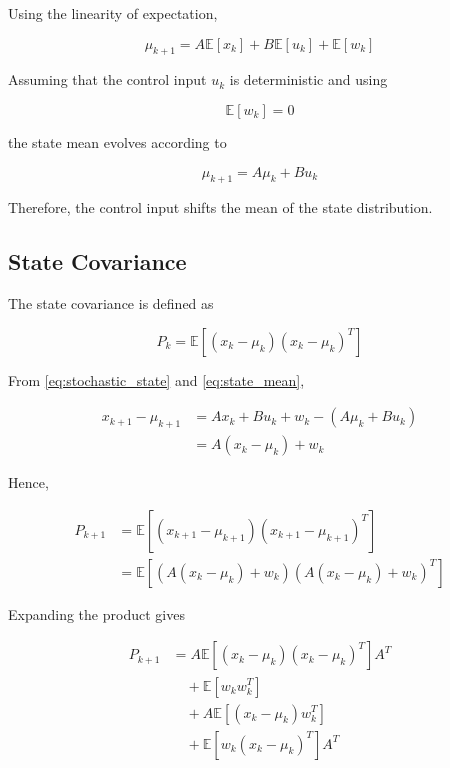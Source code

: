 Using the linearity of expectation,

\begin{equation}
    \mu_{k+1}
    =
    A\mathbb{E}[x_k]
    +
    B\mathbb{E}[u_k]
    +
    \mathbb{E}[w_k]
\end{equation}

Assuming that the control input \(u_k\) is deterministic and using

\begin{equation}
    \mathbb{E}[w_k]=0
\end{equation}

the state mean evolves according to

\begin{equation}
    \boxed{
    \mu_{k+1}
    =
    A\mu_k + Bu_k
    }
    \label{eq:state_mean}
\end{equation}

Therefore, the control input shifts the mean of the state distribution.

\subsection{State Covariance}

The state covariance is defined as

\begin{equation}
    P_k
    =
    \mathbb{E}
    \left[
        (x_k-\mu_k)
        (x_k-\mu_k)^T
    \right]
\end{equation}

From \cref{eq:stochastic_state} and \cref{eq:state_mean},

\begin{align}
    x_{k+1}-\mu_{k+1}
    &=
    Ax_k+Bu_k+w_k
    -
    \left(
        A\mu_k+Bu_k
    \right) \\
    &=
    A(x_k-\mu_k)+w_k
\end{align}

Hence,

\begin{align}
    P_{k+1}
    &=
    \mathbb{E}
    \left[
        (x_{k+1}-\mu_{k+1})
        (x_{k+1}-\mu_{k+1})^T
    \right] \\
    &=
    \mathbb{E}
    \left[
        \left(
            A(x_k-\mu_k)+w_k
        \right)
        \left(
            A(x_k-\mu_k)+w_k
        \right)^T
    \right]
\end{align}

Expanding the product gives

\begin{align}
    P_{k+1}
    &=
    A
    \mathbb{E}
    \left[
        (x_k-\mu_k)
        (x_k-\mu_k)^T
    \right]
    A^T
    \nonumber\\
    &\quad+
    \mathbb{E}[w_kw_k^T]
    \nonumber\\
    &\quad+
    A
    \mathbb{E}
    \left[
        (x_k-\mu_k)w_k^T
    \right]
    \nonumber\\
    &\quad+
    \mathbb{E}
    \left[
        w_k(x_k-\mu_k)^T
    \right]
    A^T
\end{align}

